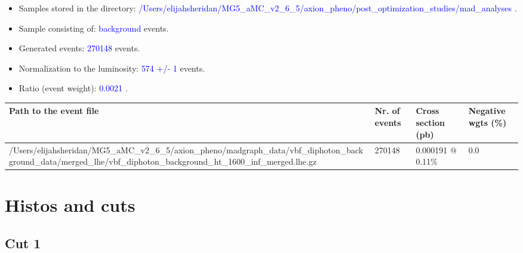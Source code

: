 \documentclass[a4paper, 10pt]{article}
\begin{document}
\begin{itemize}
  \item Samples stored in the directory: \textcolor{blue}{/\-Users/\-elijahsheridan/\-MG5\_aMC\_v2\_6\_5/\-axion\_pheno/\-post\_optimization\_studies/\-mad\_analyses} .
   \item Sample consisting of: \textcolor{blue}{background}  events.
   \item Generated events: \textcolor{blue}{270148 }  events.
   \item Normalization to the luminosity: \textcolor{blue}{574}\textcolor{blue}{ +/\-- }\textcolor{blue}{1 }  events.
   \item Ratio (event weight): \textcolor{blue}{0.0021 } .  
 
\end{itemize}
\begin{table}[H]
  \begin{center}
    \begin{tabular}{|m{55.0mm}|m{25.0mm}|m{30.0mm}|m{30.0mm}|}
      \hline
      {\cellcolor{yellow}         Path to the event file}& {\cellcolor{yellow}         Nr. of events}& {\cellcolor{yellow}         Cross section (pb)}& {\cellcolor{yellow}         Negative wgts (\%)}\\
      \hline
      {\cellcolor{white}          /\-Users/\-elijahsheridan/\-MG5\_aMC\_v2\_6\_5/\-axion\_pheno/\-madgraph\_data/\-vbf\_diphoton\_background\_data/\-merged\_lhe/\-vbf\_diphoton\_background\_ht\_1600\_inf\_merged.lhe.gz}& {\cellcolor{white}          270148}& {\cellcolor{white}          0.000191 @ 0.11\%}& {\cellcolor{white}          0.0}\\
\hline
    \end{tabular}
  \end{center}
\end{table}

\newpage
\section{ Histos and cuts}

\subsection{Cut 1}
\end{document}
